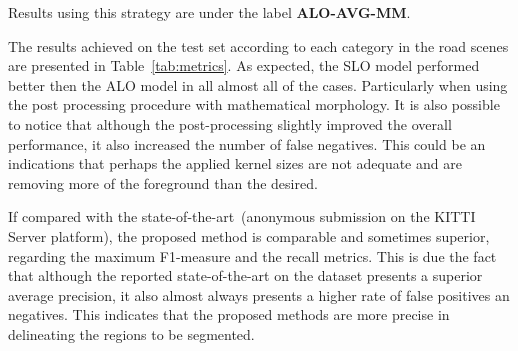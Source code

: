 Results using this strategy are under the label \textbf{ALO-AVG-MM}.

The results achieved  on the test set according to each category in the road scenes are presented in Table~\ref{tab:metrics}. As expected, the SLO model performed better then the ALO model in all almost all of the cases. Particularly when using the post processing procedure with mathematical morphology. It is also possible to notice that although the post-processing slightly improved the overall performance, it also increased the number of false negatives. This could be an indications that perhaps the applied kernel sizes are not adequate and are removing more of the foreground than the desired.   

If compared with the state-of-the-art~(anonymous submission on the KITTI Server platform), the proposed method is comparable and sometimes superior, regarding the maximum F1-measure and the recall metrics. This is due the fact that although the reported state-of-the-art on the dataset presents a superior average precision, it also almost always presents a higher rate of false positives an negatives. This indicates that the proposed methods are more precise in delineating the regions to be segmented.       


